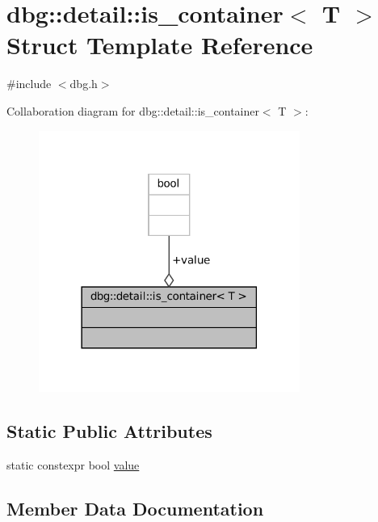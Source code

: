 \hypertarget{structdbg_1_1detail_1_1is__container}{}\section{dbg\+:\+:detail\+:\+:is\+\_\+container$<$ T $>$ Struct Template Reference}
\label{structdbg_1_1detail_1_1is__container}


{\ttfamily \#include $<$dbg.\+h$>$}



Collaboration diagram for dbg\+:\+:detail\+:\+:is\+\_\+container$<$ T $>$\+:
\nopagebreak
\begin{figure}[H]
\begin{center}
\leavevmode
\includegraphics[width=242pt]{structdbg_1_1detail_1_1is__container__coll__graph}
\end{center}
\end{figure}
\subsection*{Static Public Attributes}
\begin{DoxyCompactItemize}
\item 
static constexpr bool \hyperlink{structdbg_1_1detail_1_1is__container_aa9a4594488352384b65b36198ac414f8}{value}
\end{DoxyCompactItemize}


\subsection{Member Data Documentation}
\mbox{\label{structdbg_1_1detail_1_1is__container_aa9a4594488352384b65b36198ac414f8}} 
